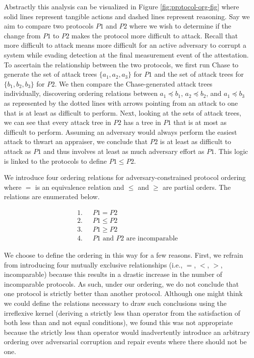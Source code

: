 \documentclass[runningheads]{llncs}
\theoremstyle{definition}
\begin{document}
Abstractly this analysis can be visualized in Figure \ref{fig:protocol-org-fig} where solid lines represent tangible actions and dashed lines represent reasoning. Say we aim to compare two protocols $P1$ and $P2$ where we wish to determine if the change from $P1$ to $P2$ makes the protocol more difficult to attack. Recall that more difficult to attack means more difficult for an active adversary to corrupt a system while evading detection at the final measurement event of the attestation. To ascertain the relationship between the two protocols, we first run Chase to generate the set of attack trees $\{ a_1, a_2, a_3\}$ for $P1$ and the set of attack trees for $\{b_1, b_2, b_3\}$ for $P2$. We then compare the Chase-generated attack trees individually, discovering ordering relations between $a_1 \preceq b_1$, $a_2 \preceq b_2$, and $a_1 \preceq b_3$ as represented by the dotted lines with arrows pointing from an attack to one that is at least as difficult to perform. Next, looking at the sets of attack trees, we can see that every attack tree in $P2$ has a tree in $P1$ that is at most as difficult to perform. Assuming an adversary would always perform the easiest attack to thwart an appraiser, we conclude that $P2$ is at least as difficult to attack as $P1$ and thus involves at least as much adversary effort as $P1$. This logic is linked to the protocols to define $ P1 \leq P2$.  

We introduce four ordering relations for adversary-constrained protocol ordering where $=$ is an equivalence relation and $\le$ and $\ge$ are partial orders. The relations are enumerated below.

\vspace*{-5mm}

\begin{align*}
1. & \text{ } P1 = P2 \\
2. & \text{ } P1 \le P2 \\
3. & \text{ } P1 \ge P2 \\
4. & \text{ } P1 \text{ and } P2 \text{ are incomparable}
\end{align*}

\noindent We choose to define the ordering in this way for a few reasons. First, we refrain from introducing four mutually exclusive relationships (i.e., $=$, $<$, $>$, incomparable) because this results in a drastic increase in the number of incomparable protocols. As such, under our ordering, we do not conclude that one protocol is strictly better than another protocol. Although one might think we could define the relations necessary to draw such conclusions using the irreflexive kernel (deriving a strictly less than operator from the satisfaction of both less than and not equal conditions), we found this was not appropriate because the strictly less than operator would inadvertently introduce an arbitrary ordering over adversarial corruption and repair events where there should not be one.  
\end{document}
